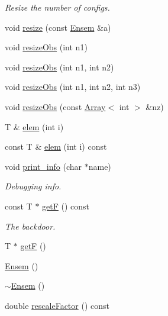 \begin{DoxyCompactItemize}
\begin{DoxyCompactList}\small\item\em Resize the number of configs. \end{DoxyCompactList}\item 
void \mbox{\hyperlink{classENSEM_1_1Ensem_acf1e1629e4e10dbd254d81d14271b763}{resize}} (const \mbox{\hyperlink{classENSEM_1_1Ensem}{Ensem}} \&a)
\item 
void \mbox{\hyperlink{classENSEM_1_1Ensem_a20ee27dffc4b1db635103ce40fb0d5c2}{resize\+Obs}} (int n1)
\item 
void \mbox{\hyperlink{classENSEM_1_1Ensem_af74074307267e421a53a3e9e9e2449fc}{resize\+Obs}} (int n1, int n2)
\item 
void \mbox{\hyperlink{classENSEM_1_1Ensem_a8d63351cad23f2af13f26c7326d1abcf}{resize\+Obs}} (int n1, int n2, int n3)
\item 
void \mbox{\hyperlink{classENSEM_1_1Ensem_a4acf05018e5c49c0053dbe8cf76a4252}{resize\+Obs}} (const \mbox{\hyperlink{classXMLArray_1_1Array}{Array}}$<$ int $>$ \&nz)
\item 
T \& \mbox{\hyperlink{classENSEM_1_1Ensem_a4927ebde99b1f0a03cdcfe3fc88458a5}{elem}} (int i)
\item 
const T \& \mbox{\hyperlink{classENSEM_1_1Ensem_a03e45aba3d9addb16e117debbc4e1a33}{elem}} (int i) const
\item 
void \mbox{\hyperlink{classENSEM_1_1Ensem_a85302bace1110e35249c88486f88d80c}{print\+\_\+info}} (char $\ast$name)
\begin{DoxyCompactList}\small\item\em Debugging info. \end{DoxyCompactList}\item 
const T $\ast$ \mbox{\hyperlink{classENSEM_1_1Ensem_ad2cb7a34934bedeaa29f49c78cdb8371}{getF}} () const
\begin{DoxyCompactList}\small\item\em The backdoor. \end{DoxyCompactList}\item 
T $\ast$ \mbox{\hyperlink{classENSEM_1_1Ensem_ab2909a7d9b171d7e2ba7365c5e962aa6}{getF}} ()
\item 
\mbox{\hyperlink{classENSEM_1_1Ensem_a8875b85c5536f02d10db536a815984b6}{Ensem}} ()
\item 
\mbox{\hyperlink{classENSEM_1_1Ensem_a01e4e19b101048ad2ffcf886017592c9}{$\sim$\+Ensem}} ()
\item 
double \mbox{\hyperlink{classENSEM_1_1Ensem_aecf90199daafa73454e9c1aceef313a4}{rescale\+Factor}} () const

\end{DoxyCompactItemize}
